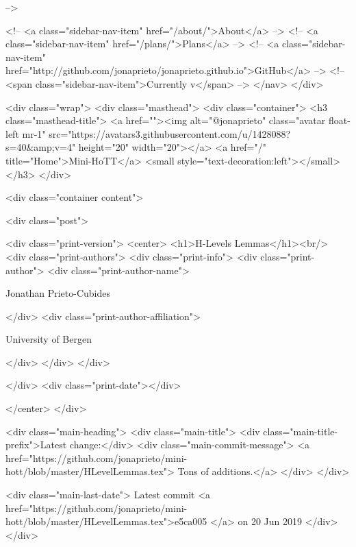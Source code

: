       
     -->

    <!-- <a class="sidebar-nav-item" href="/about/">About</a> -->
    <!-- <a class="sidebar-nav-item" href="/plans/">Plans</a> -->
    <!-- <a class="sidebar-nav-item" href="http://github.com/jonaprieto/jonaprieto.github.io">GitHub</a> -->
    <!-- <span class="sidebar-nav-item">Currently v</span> -->
  </nav>
</div>

    <div class="wrap">
      <div class="masthead">
        <div class="container">
          <h3 class="masthead-title">
            <a href=""><img alt="@jonaprieto" class="avatar float-left mr-1" src="https://avatars3.githubusercontent.com/u/1428088?s=40&amp;v=4" height="20" width="20"></a>
            <a href="/" title="Home">Mini-HoTT</a>
            <small style="text-decoration:left"></small>
          </h3>
        </div>
      
      <div class="container content">
        







<div class="post">

  <div class="print-version">
    <center>
      <h1>H-Levels Lemmas</h1><br/>
        <div class="print-authors">
          <div class="print-info">
            <div class="print-author">
              <div class="print-author-name">
                
                  Jonathan Prieto-Cubides
                
              </div>
              <div class="print-author-affiliation">
                
                  University of Bergen
                
                </div>
            </div>
          </div>
          
          
        </div>
        <div class="print-date"></div>
        
        
    </center>
  </div>

  
  <div class="main-heading">
    <div class="main-title">
      <div class="main-title-prefix">Latest change:</div>
      <div class="main-commit-message">
            <a href="https://github.com/jonaprieto/mini-hott/blob/master/HLevelLemmas.tex">
              Tons of additions.</a>
      </div>
    </div>

    <div class="main-last-date">
      Latest commit <a href="https://github.com/jonaprieto/mini-hott/blob/master/HLevelLemmas.tex">e5ca005 </a> on  20 Jun 2019
    </div>
  </div>
  
